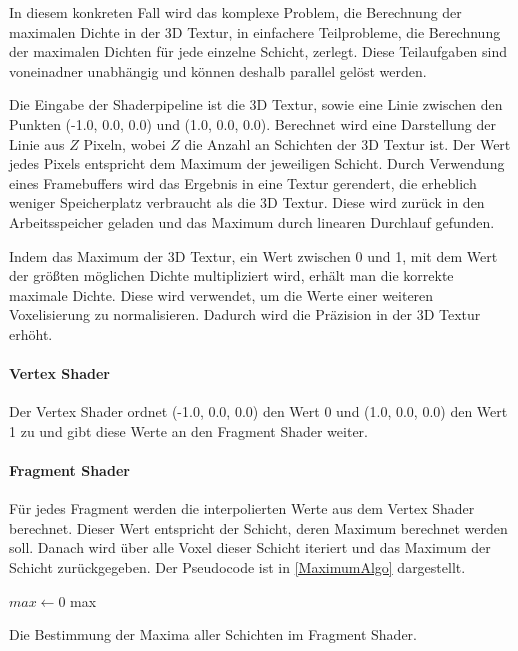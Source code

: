 \documentclass[a4paper,fontsize=12pt,toc=bib,halfparskip,ngerman]{scrartcl}
\begin{document}
In diesem konkreten Fall wird das komplexe Problem, die Berechnung der maximalen Dichte in der 3D Textur, in einfachere Teilprobleme, die Berechnung der maximalen Dichten f\"ur jede einzelne Schicht, zerlegt. Diese Teilaufgaben sind voneinadner unabh\"angig und k\"onnen deshalb parallel gel\"ost werden.

Die Eingabe der Shaderpipeline ist die 3D Textur, sowie eine Linie zwischen den Punkten (-1.0, 0.0, 0.0) und (1.0, 0.0, 0.0). Berechnet wird eine Darstellung der Linie aus $Z$ Pixeln, wobei $Z$ die Anzahl an Schichten der 3D Textur ist. Der Wert jedes Pixels entspricht dem Maximum der jeweiligen Schicht. Durch Verwendung eines Framebuffers wird das Ergebnis in eine Textur gerendert, die erheblich weniger Speicherplatz verbraucht als die 3D Textur. Diese wird zur\"uck in den Arbeitsspeicher geladen und das Maximum durch linearen Durchlauf gefunden.

Indem das Maximum der 3D Textur, ein Wert zwischen 0 und 1, mit dem Wert der gr\"o{\ss}ten m\"oglichen Dichte multipliziert wird, erh\"alt man die korrekte maximale Dichte. Diese wird verwendet, um die Werte einer weiteren Voxelisierung zu normalisieren. Dadurch wird die Pr\"azision in der 3D Textur erh\"oht.

\paragraph{Vertex Shader}
Der Vertex Shader ordnet (-1.0, 0.0, 0.0) den Wert 0 und (1.0, 0.0, 0.0) den Wert 1 zu und gibt diese Werte an den Fragment Shader weiter.

\paragraph{Fragment Shader}
F\"ur jedes Fragment werden die interpolierten Werte aus dem Vertex Shader berechnet. Dieser Wert entspricht der Schicht, deren Maximum berechnet werden soll. Danach wird \"uber alle Voxel dieser Schicht iteriert und das Maximum der Schicht zur\"uckgegeben. Der Pseudocode ist in \cref{MaximumAlgo} dargestellt.

\begin{algorithm}
	
	$max \gets 0$\;
	\Return max\;
	\vspace{0.5cm}
	\caption{Die Bestimmung der Maxima aller Schichten im Fragment Shader.}
	\label{MaximumAlgo}
\end{algorithm}
\end{document}
